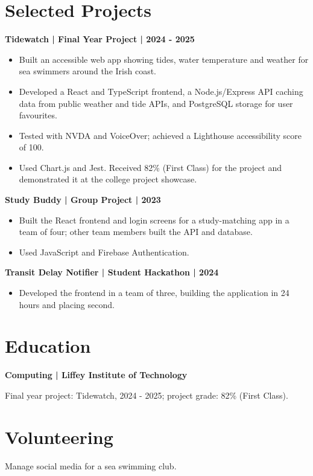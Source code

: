 \documentclass[11pt,a4paper]{article}
\newcommand{\cvsection}[1]{\section*{#1}}
\newcommand{\cvitem}[1]{\par\noindent\textbf{#1}\par}
\begin{document}
\cvsection{Selected Projects}
\cvitem{Tidewatch | Final Year Project | 2024 - 2025}
\begin{itemize}
\item Built an accessible web app showing tides, water temperature and weather for sea swimmers around the Irish coast.
\item Developed a React and TypeScript frontend, a Node.js/Express API caching data from public weather and tide APIs, and PostgreSQL storage for user favourites.
\item Tested with NVDA and VoiceOver; achieved a Lighthouse accessibility score of 100.
\item Used Chart.js and Jest. Received 82\% (First Class) for the project and demonstrated it at the college project showcase.
\end{itemize}
\cvitem{Study Buddy | Group Project | 2023}
\begin{itemize}
\item Built the React frontend and login screens for a study-matching app in a team of four; other team members built the API and database.
\item Used JavaScript and Firebase Authentication.
\end{itemize}
\cvitem{Transit Delay Notifier | Student Hackathon | 2024}
\begin{itemize}
\item Developed the frontend in a team of three, building the application in 24 hours and placing second.
\end{itemize}

\cvsection{Education}
\cvitem{Computing | Liffey Institute of Technology}
Final year project: Tidewatch, 2024 - 2025; project grade: 82\% (First Class).

\cvsection{Volunteering}
Manage social media for a sea swimming club.
\end{document}
